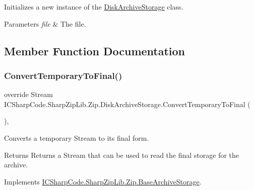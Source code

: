 Initializes a new instance of the \hyperlink{class_i_c_sharp_code_1_1_sharp_zip_lib_1_1_zip_1_1_disk_archive_storage}{Disk\+Archive\+Storage} class. 


\begin{DoxyParams}{Parameters}
{\em file} & The file.\\
\hline
\end{DoxyParams}


\subsection{Member Function Documentation}
\mbox{\label{class_i_c_sharp_code_1_1_sharp_zip_lib_1_1_zip_1_1_disk_archive_storage_a90e6fad96f28a6539c5ea2b4a0ac28c0}} 
\subsubsection{\texorpdfstring{Convert\+Temporary\+To\+Final()}{ConvertTemporaryToFinal()}}
{\footnotesize\ttfamily override Stream I\+C\+Sharp\+Code.\+Sharp\+Zip\+Lib.\+Zip.\+Disk\+Archive\+Storage.\+Convert\+Temporary\+To\+Final (\begin{DoxyParamCaption}{ }\end{DoxyParamCaption})\hspace{0.3cm}{\ttfamily [inline]}, {\ttfamily [virtual]}}



Converts a temporary Stream to its final form. 

\begin{DoxyReturn}{Returns}
Returns a Stream that can be used to read the final storage for the archive.
\end{DoxyReturn}


Implements \hyperlink{class_i_c_sharp_code_1_1_sharp_zip_lib_1_1_zip_1_1_base_archive_storage_ab20872fd7a5c31f1765bc36f3a37040f}{I\+C\+Sharp\+Code.\+Sharp\+Zip\+Lib.\+Zip.\+Base\+Archive\+Storage}.

